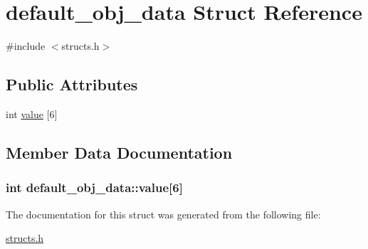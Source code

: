 \hypertarget{structdefault__obj__data}{\section{default\-\_\-obj\-\_\-data Struct Reference}
\label{structdefault__obj__data}
}


{\ttfamily \#include $<$structs.\-h$>$}

\subsection*{Public Attributes}
\begin{DoxyCompactItemize}
\item 
int \hyperlink{structdefault__obj__data_a99141d7e97c64a4ec81426749ab02226}{value} \mbox{[}6\mbox{]}
\end{DoxyCompactItemize}


\subsection{Member Data Documentation}
\hypertarget{structdefault__obj__data_a99141d7e97c64a4ec81426749ab02226}{
\subsubsection[{value}]{\setlength{\rightskip}{0pt plus 5cm}int default\-\_\-obj\-\_\-data\-::value\mbox{[}6\mbox{]}}}\label{structdefault__obj__data_a99141d7e97c64a4ec81426749ab02226}


The documentation for this struct was generated from the following file\-:\begin{DoxyCompactItemize}
\item 
\hyperlink{structs_8h}{structs.\-h}\end{DoxyCompactItemize}
